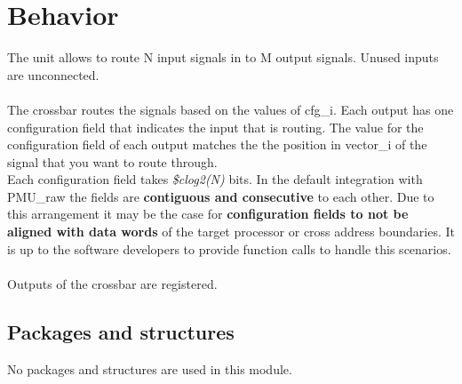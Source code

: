 \section{Behavior}
The unit allows to route N input signals in to M output signals. Unused inputs are unconnected.\\
\\
The crossbar routes the signals based on the values of cfg\_i. Each output has one configuration field that indicates the input that is routing. The value for the configuration field of each output matches the the position in vector\_i of the signal that you want to route through.\\
Each configuration field takes\textit{ \$clog2(N)} bits. In the default integration with PMU\_raw the fields are\textbf{ contiguous and consecutive} to each other. Due to this arrangement it may be the case for \textbf{configuration fields to not be aligned with data words} of the target processor or cross address boundaries. It is up to the software developers to provide function calls to handle this scenarios.\\
\\
Outputs of the crossbar are registered.


\subsection{Packages and structures}

No packages and structures are used in this module.

